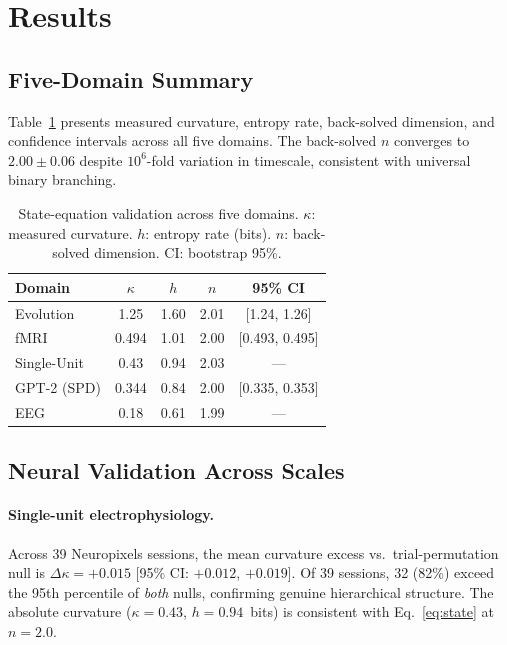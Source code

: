 \documentclass[letterpaper]{article}
\begin{document}
\section{Results}\label{sec:results}

\subsection{Five-Domain Summary}

Table~\ref{tab:results} presents measured curvature,
entropy rate, back-solved dimension, and confidence
intervals across all five domains.
The back-solved $n$ converges to $2.00\pm0.06$ despite
$10^6$-fold variation in timescale, consistent with
universal binary branching.

\begin{table}[t]
\centering
\caption{State-equation validation across five domains.
  $\kappa$: measured curvature. $h$: entropy rate (bits).
  $n$: back-solved dimension. CI: bootstrap 95\%.}
\label{tab:results}
\smallskip
\begin{tabular}{@{}lcccc@{}}
\toprule
\textbf{Domain} & $\kappa$ & $h$ & $n$ & 95\% CI \\
\midrule
Evolution       & 1.25  & 1.60 & 2.01 & [1.24, 1.26] \\
fMRI            & 0.494 & 1.01 & 2.00 & [0.493, 0.495] \\
Single-Unit     & 0.43  & 0.94 & 2.03 & --- \\
GPT-2 (SPD)     & 0.344 & 0.84 & 2.00 & [0.335, 0.353] \\
EEG             & 0.18  & 0.61 & 1.99 & --- \\
\bottomrule
\end{tabular}
\end{table}

\subsection{Neural Validation Across Scales}

\paragraph{Single-unit electrophysiology.}
Across 39 Neuropixels sessions, the mean curvature
excess vs.\ trial-permutation null is
$\Delta\kappa=+0.015$ [95\% CI: $+0.012$, $+0.019$].
Of 39 sessions, 32 (82\%) exceed the 95th percentile
of \emph{both} nulls, confirming genuine hierarchical
structure.
The absolute curvature ($\kappa=0.43$, $h=0.94$~bits)
is consistent with Eq.~\eqref{eq:state} at $n=2.0$.
\end{document}
